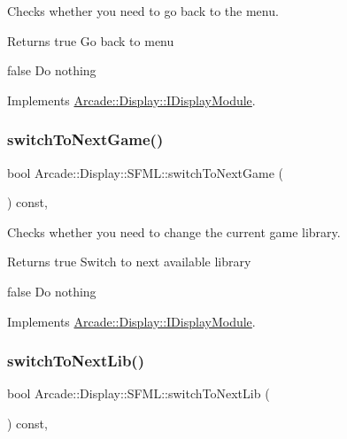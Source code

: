 Checks whether you need to go back to the menu. 

\begin{DoxyReturn}{Returns}
true Go back to menu 

false Do nothing 
\end{DoxyReturn}


Implements \mbox{\hyperlink{classArcade_1_1Display_1_1IDisplayModule_ad060f6b99f2adffaf02a4226fc40d0ab}{Arcade\+::\+Display\+::\+I\+Display\+Module}}.

\mbox{\label{classArcade_1_1Display_1_1SFML_af47adddb8c2f26b5ee0109abce03e27a}} 
\subsubsection{\texorpdfstring{switchToNextGame()}{switchToNextGame()}}
{\footnotesize\ttfamily bool Arcade\+::\+Display\+::\+S\+F\+M\+L\+::switch\+To\+Next\+Game (\begin{DoxyParamCaption}{ }\end{DoxyParamCaption}) const\hspace{0.3cm}{\ttfamily [final]}, {\ttfamily [virtual]}}



Checks whether you need to change the current game library. 

\begin{DoxyReturn}{Returns}
true Switch to next available library 

false Do nothing 
\end{DoxyReturn}


Implements \mbox{\hyperlink{classArcade_1_1Display_1_1IDisplayModule_a9584cb0ca3b157c9a4ec94509e4f8e32}{Arcade\+::\+Display\+::\+I\+Display\+Module}}.

\mbox{\label{classArcade_1_1Display_1_1SFML_a3e7d385aaa46e9137f41e4d78d5e233c}} 
\subsubsection{\texorpdfstring{switchToNextLib()}{switchToNextLib()}}
{\footnotesize\ttfamily bool Arcade\+::\+Display\+::\+S\+F\+M\+L\+::switch\+To\+Next\+Lib (\begin{DoxyParamCaption}{ }\end{DoxyParamCaption}) const\hspace{0.3cm}{\ttfamily [final]}, {\ttfamily [virtual]}}



